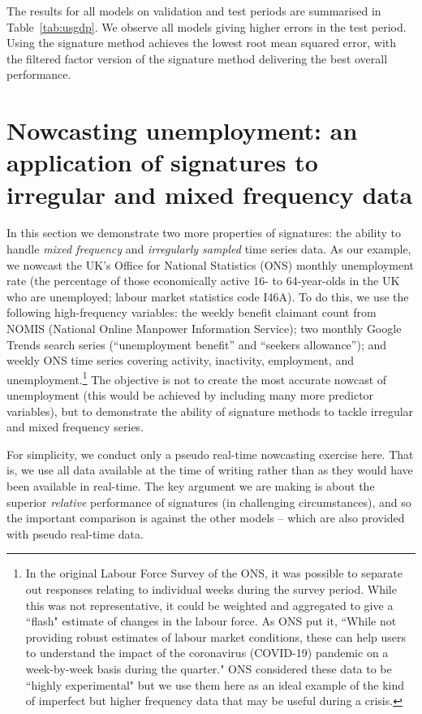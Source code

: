 \documentclass[a4paper, 12pt]{article}
\theoremstyle{remark}
\begin{document}
The results for all models on validation and test periods are summarised in Table~\ref{tab:usgdp}. We observe all models giving higher errors in the test period. Using the signature method achieves the lowest root mean squared error, with the filtered factor version of the signature method delivering the best overall performance.

\section{Nowcasting unemployment: an application of signatures to irregular and mixed frequency data} \label{sec:lfsapplication} 

In this section we demonstrate two more properties of signatures: the ability to handle \textit{mixed frequency} and \textit{irregularly sampled} time series data. As our example, we nowcast the UK's Office for National Statistics (ONS) monthly unemployment rate (the percentage of those economically active 16- to 64-year-olds in the UK who are unemployed; labour market statistics code I46A). To do this, we use the following high-frequency variables: the weekly benefit claimant count from NOMIS (National Online Manpower Information Service); two monthly Google Trends search series (``unemployment benefit'' and ``seekers allowance''); and weekly ONS time series covering activity, inactivity, employment, and unemployment.\footnote{In the original Labour Force Survey of the ONS, it was possible to separate out responses relating to individual weeks during the survey period. While this was not representative, it could be weighted and aggregated to give a ``flash" estimate of changes in the labour force. As ONS put it, ``While not providing robust estimates of labour market conditions, these can help users to understand the impact of the coronavirus (COVID-19) pandemic on a week-by-week basis during the quarter." ONS considered these data to be ``highly experimental" but we use them here as an ideal example of the kind of imperfect but higher frequency data that may be useful during a crisis.
} The objective is not to create the most accurate nowcast of unemployment (this would be achieved by including many more predictor variables), but to demonstrate the ability of signature methods to tackle irregular and mixed frequency series.

For simplicity, we conduct only a pseudo real-time nowcasting exercise here. That is, we use all data available at the time of writing rather than as they would have been available in real-time. The key argument we are making is about the superior \textit{relative} performance of signatures (in challenging circumstances), and so the important comparison is against the other models -- which are also provided with pseudo real-time data.
\end{document}
